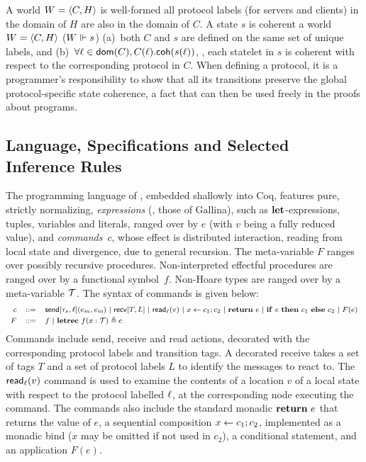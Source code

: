 A world $W = \langle{C, H}\rangle$ is well-formed \Iff all
protocol labels (for servers and clients) in the domain of $H$ are
also in the domain of $C$.
%
A state $s$ is coherent \wrt a world $W = \langle{C, H}\rangle$
(${W} \Vdash {s}$) \Iff (a)~both $C$ and $s$ are defined on the same set
of unique labels, and
(b)~$\forall \ell \in \mathsf{dom}(C), C(\ell).\mathsf{coh}(s(\ell))$, \ie, each
statelet in $s$ is coherent with respect to the corresponding protocol
in $C$.
%
When defining a protocol, it is a programmer's responsibility to show
that all its transitions preserve the global protocol-specific state
coherence, a fact that can then be used freely in the proofs about
programs.

\subsection{Language, Specifications and Selected Inference Rules}
\label{sec:stat-mess-soups}



The programming language of \disel, embedded shallowly into Coq,
features pure, strictly normalizing, \emph{expressions} (\ie, those of
Gallina), such as $\mathsf{{\bf let}}{}$-expressions, tuples, variables and literals,
ranged over by $e$ (with $v$ being a fully reduced value), and
\emph{commands}~$c$, whose effect is distributed interaction, reading
from local state and divergence, due to general recursion. The
meta-variable $F$ ranges over possibly recursive
procedures. Non-interpreted effectful procedures are ranged over by a
functional symbol~$f$. Non-Hoare types are ranged over by a
meta-variable $\mathcal{T}$.
%
The syntax of \disel commands is given below:
%
\[
{\footnotesize
\begin{array}{rcl}
  c & ::= &  \mathsf{send}[\tau_s, \ell](e_m, e_{\mathit{to}}) ~|~ \mathsf{recv}[T, L] ~|~  \mathsf{{read}}{}_{\ell}(v)  ~|~  x \leftarrow c_1; c_2 ~|~ \mathsf{{\bf return}}{}~e ~|~
            \mathsf{{\bf if}}{}~e~\mathsf{{\bf then}}{}~c_1~\mathsf{{\bf else}}{}~c_2 ~|~
            F(e)
  \\[2pt]
  F & ::= & f ~|~ \mathsf{{\bf letrec}}{}~f (x : \mathcal{T}) \triangleq c
\end{array}
}
\]
%
Commands include send, receive and read actions, decorated with the
corresponding protocol labels and transition tags. A decorated receive
takes a set of tags $T$ and a set of protocol labels $L$ to identify
the messages to react to. The $\mathsf{{read}}{}_{\ell}(v)$ command is used to
examine the contents of a location $v$ of a local state with respect
to the protocol labelled $\ell$, at the corresponding node executing
the command.
%
The commands also include the standard monadic $\mathsf{{\bf return}}{}~e$ that returns
the value of $e$, a sequential composition $x \leftarrow c_1; c_2$,
implemented as a monadic bind ($x$ may be omitted if not used in
$c_2$), a conditional statement, and an application $F(e)$.

